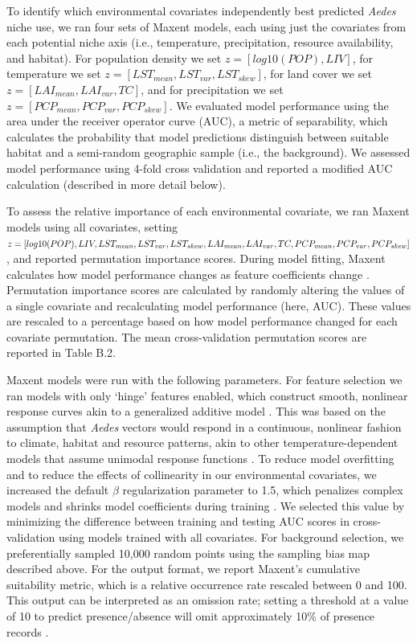 To identify which environmental covariates independently best predicted \textit{Aedes} niche use, we ran four sets of Maxent models, each using just the covariates from each potential niche axis (i.e., temperature, precipitation, resource availability, and habitat). For population density we set $z = [log10(POP), LIV]$, for temperature we set $z = [LST_{mean}, LST_{var}, LST_{skew}]$, for land cover we set $z = [LAI_{mean}, LAI_{var}, TC]$, and for precipitation we set $z = [PCP_{mean}, PCP_{var}, PCP_{skew}]$. We evaluated model performance using the area under the receiver operator curve (AUC), a metric of separability, which calculates the probability that model predictions distinguish between suitable habitat and a semi-random geographic sample (i.e., the background). We assessed model performance using 4-fold cross validation and reported a modified AUC calculation (described in more detail below).

To assess the relative importance of each environmental covariate, we ran Maxent models using all covariates, setting $z = [log10(POP), LIV, LST_{mean}, LST_{var}, LST_{skew}, LAI_{mean}, LAI_{var}, TC, PCP_{mean}, PCP_{var},\\ PCP_{skew}]$, and reported permutation importance scores. During model fitting, Maxent calculates how model performance changes as feature coefficients change \cite{Phillips2008-ic}. Permutation importance scores are calculated by randomly altering the values of a single covariate and recalculating model performance (here, AUC). These values are rescaled to a percentage based on how model performance changed for each covariate permutation. The mean cross-validation permutation scores are reported in Table B.2.

Maxent models were run with the following parameters. For feature selection we ran models with only ‘hinge’ features enabled, which construct smooth, nonlinear response curves akin to a generalized additive model \cite{Hastie2004-bw, Elith2011-kb}. This was based on the assumption that \textit{Aedes} vectors would respond in a continuous, nonlinear fashion to climate, habitat and resource patterns, akin to other temperature-dependent models that assume unimodal response functions \cite{Mordecai2017-tb}. To reduce model overfitting and to reduce the effects of collinearity in our environmental covariates, we increased the default $\beta$ regularization parameter to 1.5, which penalizes complex models and shrinks model coefficients during training \cite{Merow2013-mw}. We selected this value by minimizing the difference between training and testing AUC scores in cross-validation using models trained with all covariates. For background selection, we preferentially sampled 10,000 random points using the sampling bias map described above. For the output format, we report Maxent’s cumulative suitability metric, which is a relative occurrence rate rescaled between 0 and 100. This output can be interpreted as an omission rate; setting a threshold at a value of 10 to predict presence/absence will omit approximately 10\% of presence records \cite{Phillips2008-ic, Merow2013-mw}.

